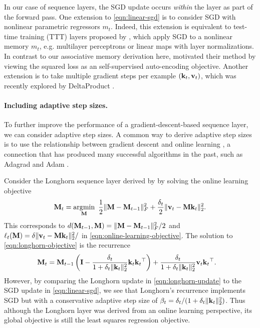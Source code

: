 \documentclass[notitlepage, 11pt]{article}
\newcommand*{\memory}{{m}}
\begin{document}
In our case of sequence layers, the SGD update occurs \emph{within} the layer as part of the forward pass.
One extension to \autoref{eqn:linear-sgd} is to consider SGD with nonlinear parametric regressors $\memory_t$.
Indeed, this extension is equivalent to test-time training (TTT) layers proposed by \citet{Sun2024LearningLearnTest}, which apply SGD to a nonlinear memory $\memory_t$, e.g. multilayer perceptrons or linear maps with layer normalizations.
In contrast to our associative memory derivation here, \citet{Sun2024LearningLearnTest} motivated their method by viewing the squared loss as an self-supervised auto-encoding objective.
Another extension is to take multiple gradient steps per example $(\mathbf{k}_t, \mathbf{v}_t)$, which was recently explored by DeltaProduct \citep{Siems2025DeltaProductIncreasingExpressivity}.

\paragraph{Including adaptive step sizes.}
To further improve the performance of a gradient-descent-based sequence layer, we can consider adaptive step sizes.
A common way to derive adaptive step sizes is to use the relationship between gradient descent and online learning \citep{Cesa-Bianchi2004GeneralizationAbilityOnline,Zinkevich2003OnlineConvexProgramming}, a connection that has produced many successful algorithms in the past, such as Adagrad \citep{Duchi2011AdaptiveSubgradientMethods} and Adam \citep{Kingma2015AdamMethodStochastic}.

Consider the Longhorn sequence layer derived by \citet{Liu2024LonghornStateSpace} by solving the online learning objective
\begin{align}
\mathbf{M}_{t} = \operatorname*{\arg\!\min}_{\mathbf{M}}\ \frac{1}{2}\lVert\mathbf{M} - \mathbf{M}_{t-1}\rVert_F^2 + \frac{\delta_t}{2} \lVert\mathbf{v}_t - \mathbf{M} \mathbf{k}_t\rVert_2^2.\label{eqn:longhorn-objective}
\end{align}
This corresponds to $d(\mathbf{M}_{t-1}, \mathbf{M}) = \lVert\mathbf{M} - \mathbf{M}_{t-1}\rVert_F^2/2$ and $\ell_t(\mathbf{M}) = \delta \lVert\mathbf{v}_t - \mathbf{M} \mathbf{k}_t\rVert_2^2/$ in \autoref{eqn:online-learning-objective}.
The solution to \autoref{eqn:longhorn-objective} is the recurrence
\begin{align}
    \mathbf{M}_{t} &= \mathbf{M}_{t-1}\left(\mathbf{I} - \frac{\delta_t}{1 + \delta_t\lVert\mathbf{k}_t\rVert_2^2} {\mathbf{k}_t\mathbf{k}_t{}^\top}\right) + \frac{\delta_t}{1 + \delta_t \lVert\mathbf{k}_t\rVert_2^2}\mathbf{v}_t\mathbf{k}_t{}^\top.\label{eqn:longhorn-update}
\end{align}
However, by comparing the Longhorn update in \autoref{eqn:longhorn-update} to the SGD update in \autoref{eqn:linear-sgd}, we see that Longhorn's recurrence implements SGD but with a conservative adaptive step size of $\beta_t = \delta_t / (1 + \delta_t\lVert\mathbf{k}_t\rVert_2^2)$.
Thus although the Longhorn layer was derived from an online learning perspective, its global objective is still the least squares regression objective.
\end{document}
